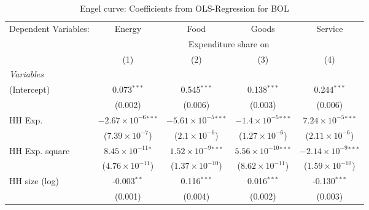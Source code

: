 
\begin{table}[htbp!]
   \centering
   \small
   \begin{adjustbox}{width = 1\textwidth, max height = 0.95\textheight, center}
      \begin{threeparttable}[b]
         \caption{\label{tab:Engel_parametric_BOL} Engel curve: Coefficients from OLS-Regression for BOL}
         \begin{tabular}{lcccc}
            \tabularnewline \midrule \midrule
            Dependent Variables: & Energy                         & Food                           & Goods                          & Service\\  
             & \multicolumn{4}{c}{Expenditure share on} \\ 
                                 & (1)                            & (2)                            & (3)                            & (4)\\  
            \midrule
            \emph{Variables}\\
            (Intercept)          & 0.073$^{***}$                  & 0.545$^{***}$                  & 0.138$^{***}$                  & 0.244$^{***}$\\   
                                 & (0.002)                        & (0.006)                        & (0.003)                        & (0.006)\\   
            HH Exp.              & $-2.67\times 10^{-6}$$^{***}$  & $-5.61\times 10^{-5}$$^{***}$  & $-1.4\times 10^{-5}$$^{***}$   & $7.24\times 10^{-5}$$^{***}$\\    
                                 & ($7.39\times 10^{-7}$)         & ($2.1\times 10^{-6}$)          & ($1.27\times 10^{-6}$)         & ($2.11\times 10^{-6}$)\\    
            HH Exp. square       & $8.45\times 10^{-11}$$^{*}$    & $1.52\times 10^{-9}$$^{***}$   & $5.56\times 10^{-10}$$^{***}$  & $-2.14\times 10^{-9}$$^{***}$\\    
                                 & ($4.76\times 10^{-11}$)        & ($1.37\times 10^{-10}$)        & ($8.62\times 10^{-11}$)        & ($1.59\times 10^{-10}$)\\    
            HH size (log)        & -0.003$^{**}$                  & 0.116$^{***}$                  & 0.016$^{***}$                  & -0.130$^{***}$\\   
                                 & (0.001)                        & (0.004)                        & (0.002)                        & (0.003)\\   

\end{tabular}
\end{threeparttable}
\end{adjustbox}
\end{table}
